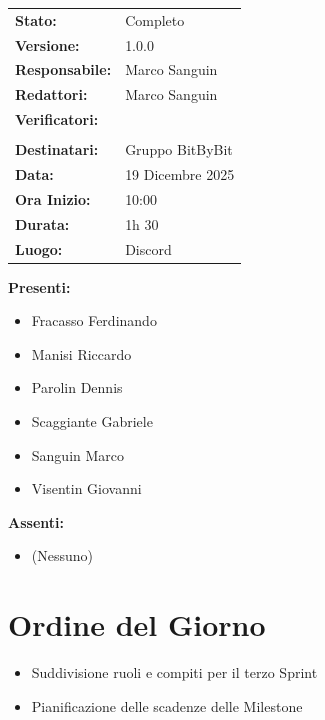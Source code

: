 \documentclass[a4paper,12pt]{article}
\begin{document}
\begin{tcolorbox}
\begin{tabularx}{\textwidth}{@{}l X@{}}
\textbf{Stato:} & Completo \\
\textbf{Versione:} & 1.0.0 \\
\textbf{Responsabile:} & Marco Sanguin\\
\textbf{Redattori:} & Marco Sanguin \\
\textbf{Verificatori:} & 
\begin{tabular}[t]{@{}l@{}}
    Giovanni Visentin\\
\end{tabular} \\
\textbf{Destinatari:} & Gruppo BitByBit \\
\textbf{Data:} & 19 Dicembre 2025 \\
\textbf{Ora Inizio:} & 10:00 \\
\textbf{Durata:} & 1h 30 \\
\textbf{Luogo:} & Discord \\
\end{tabularx}
\end{tcolorbox}


\textbf{Presenti:} 
\begin{itemize}
    \item Fracasso Ferdinando
    \item Manisi Riccardo
    \item Parolin Dennis
    \item Scaggiante Gabriele
    \item Sanguin Marco
    \item Visentin Giovanni 
\end{itemize} 
\textbf{Assenti:} 
    \begin{itemize}
\item (Nessuno)
\end{itemize} 
\vspace*{\fill} %

\clearpage

\clearpage
\tableofcontents
\thispagestyle{empty} %
\clearpage

\section{Ordine del Giorno}
\begin{itemize}
    \item Suddivisione ruoli e compiti per il terzo Sprint
    \item Pianificazione delle scadenze delle Milestone
\end{itemize}
\end{document}
